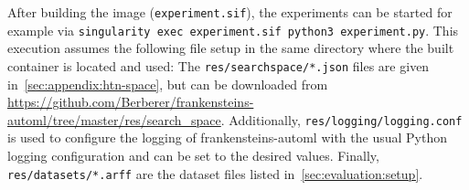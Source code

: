 After building the image (\texttt{experiment.sif}), the experiments can be started for example via \texttt{singularity exec experiment.sif python3 experiment.py}.\newline
This execution assumes the following file setup in the same directory where the built container is located and used:
The \texttt{res/searchspace/*.json} files are given in~\ref{sec:appendix:htn-space}, but can be downloaded from \url{https://github.com/Berberer/frankensteins-automl/tree/master/res/search_space}.
Additionally, \texttt{res/logging/logging.conf} is used to configure the logging of frankensteins-automl with the usual Python logging configuration and can be set to the desired values.
Finally, \texttt{res/datasets/*.arff} are the dataset files listed in~\ref{sec:evaluation:setup}.
